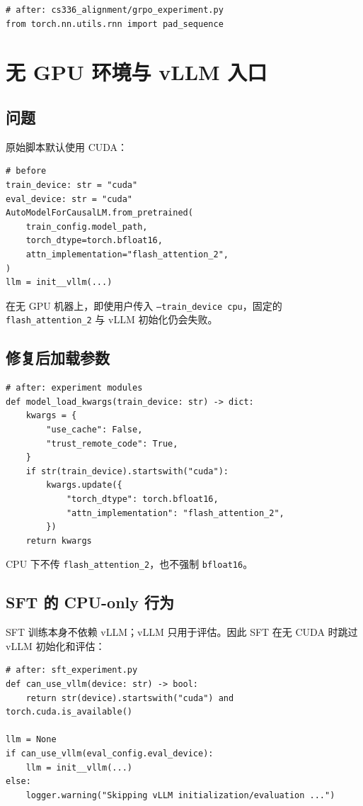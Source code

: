 \documentclass[UTF8,a4paper,11pt]{ctexart}
\begin{document}
\begin{lstlisting}
# after: cs336_alignment/grpo_experiment.py
from torch.nn.utils.rnn import pad_sequence
\end{lstlisting}

\section{无 GPU 环境与 vLLM 入口}

\subsection{问题}

原始脚本默认使用 CUDA：

\begin{lstlisting}
# before
train_device: str = "cuda"
eval_device: str = "cuda"
AutoModelForCausalLM.from_pretrained(
    train_config.model_path,
    torch_dtype=torch.bfloat16,
    attn_implementation="flash_attention_2",
)
llm = init__vllm(...)
\end{lstlisting}

在无 GPU 机器上，即使用户传入 \texttt{--train\_device cpu}，固定的 \texttt{flash\_attention\_2} 与 vLLM 初始化仍会失败。

\subsection{修复后加载参数}

\begin{lstlisting}
# after: experiment modules
def model_load_kwargs(train_device: str) -> dict:
    kwargs = {
        "use_cache": False,
        "trust_remote_code": True,
    }
    if str(train_device).startswith("cuda"):
        kwargs.update({
            "torch_dtype": torch.bfloat16,
            "attn_implementation": "flash_attention_2",
        })
    return kwargs
\end{lstlisting}

CPU 下不传 \texttt{flash\_attention\_2}，也不强制 \texttt{bfloat16}。

\subsection{SFT 的 CPU-only 行为}

SFT 训练本身不依赖 vLLM；vLLM 只用于评估。因此 SFT 在无 CUDA 时跳过 vLLM 初始化和评估：

\begin{lstlisting}
# after: sft_experiment.py
def can_use_vllm(device: str) -> bool:
    return str(device).startswith("cuda") and torch.cuda.is_available()

llm = None
if can_use_vllm(eval_config.eval_device):
    llm = init__vllm(...)
else:
    logger.warning("Skipping vLLM initialization/evaluation ...")
\end{lstlisting}
\end{document}
